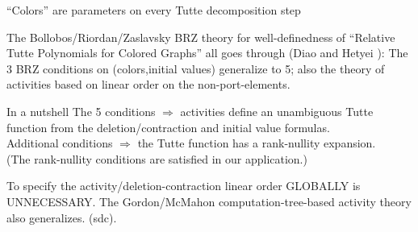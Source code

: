 \documentclass{beamer}
\begin{document}
\begin{frame}{``Colors'' are parameters on every Tutte decomposition step}

The Bollobos/Riordan/Zaslavsky BRZ theory for well-definedness
of ``Relative Tutte Polynomials for Colored Graphs'' all goes through 
(Diao and Hetyei \cite{RelTuttePoly}):
The 3 BRZ conditions on (colors,initial values) generalize to 5;
also the theory of activities
based on linear order on the non-port-elements.

\begin{block}{In a nutshell}
The 5 conditions $\Longrightarrow$ activities define an 
unambiguous Tutte function 
from the deletion/contraction and initial value formulas.\\

Additional conditions $\Longrightarrow$ the Tutte function has a rank-nullity
expansion.\\

(The rank-nullity conditions are satisfied in our application.)
\end{block}

\begin{block}{To specify the activity/deletion-contraction linear 
order GLOBALLY is 
UNNECESSARY.}
The Gordon/McMahon computation-tree-based 
activity theory also generalizes. (sdc).
\end{block}
\end{frame}
\end{document}
